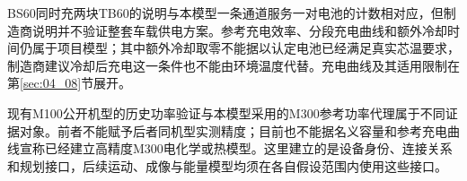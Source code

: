 BS60同时充两块TB60的说明与本模型一条通道服务一对电池的计数相对应，但制造商说明并不验证整套车载供电方案。参考充电效率、分段充电曲线和额外冷却时间仍属于项目模型；其中额外冷却取零不能据以认定电池已经满足真实芯温要求，制造商建议冷却后充电这一条件也不能由环境温度代替\cite{DJITB60}。充电曲线及其适用限制在第\ref{sec:04_08}节展开。

现有M100公开机型的历史功率验证与本模型采用的M300参考功率代理属于不同证据对象。前者不能赋予后者同机型实测精度；目前也不能据名义容量和参考充电曲线宣称已经建立高精度M300电化学或热模型。这里建立的是设备身份、连接关系和规划接口，后续运动、成像与能量模型均须在各自假设范围内使用这些接口。
